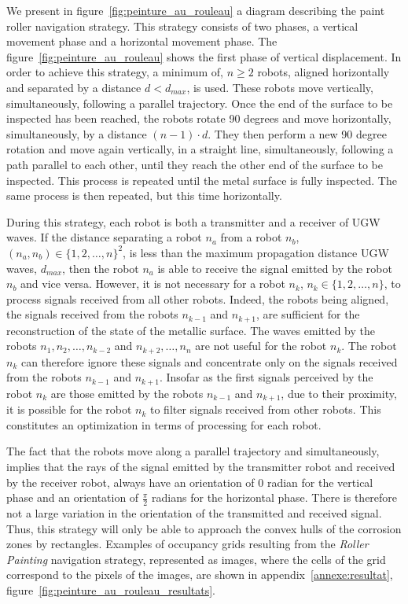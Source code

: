 \documentclass[english,RandD]{rapportPFE}  %
\begin{document}
				We present in figure~\ref{fig:peinture_au_rouleau} a diagram describing the paint roller navigation strategy.
				This strategy consists of two phases, a vertical movement phase and a horizontal movement phase.
				The figure~\ref{fig:peinture_au_rouleau} shows the first phase of vertical displacement.
				In order to achieve this strategy, a minimum of, $n \ge 2$ robots, aligned horizontally and separated by a distance $d < d_{max}$, is used.
				These robots move vertically, simultaneously, following a parallel trajectory.
				Once the end of the surface to be inspected has been reached, the robots rotate 90 degrees and move horizontally, simultaneously, by a distance $(n - 1) \cdot d$.
				They then perform a new 90 degree rotation and move again vertically, in a straight line, simultaneously, following a path parallel to each other, until they reach the other end of the surface to be inspected.
				This process is repeated until the metal surface is fully inspected.
				The same process is then repeated, but this time horizontally.

				During this strategy, each robot is both a transmitter and a receiver of UGW waves.
				If the distance separating a robot $n_a$ from a robot $n_b$, $(n_a, n_b) \in \{1, 2, \dots, n\}^2$, is less than the maximum propagation distance UGW waves, $d_{max}$, then the robot $n_a$ is able to receive the signal emitted by the robot $n_b$ and vice versa.
				However, it is not necessary for a robot $n_k$, $n_k \in \{1, 2, \dots, n\}$, to process signals received from all other robots.
				Indeed, the robots being aligned, the signals received from the robots $n_{k-1}$ and $n_{k+1}$, are sufficient for the reconstruction of the state of the metallic surface.
				The waves emitted by the robots $n_1, n_2, \dots, n_{k-2}$ and $n_{k+2}, \dots, n_n$ are not useful for the robot $n_k$.
				The robot $n_k$ can therefore ignore these signals and concentrate only on the signals received from the robots $n_{k-1}$ and $n_{k+1}$.
				Insofar as the first signals perceived by the robot $n_k$ are those emitted by the robots $n_{k-1}$ and $n_{k+1}$, due to their proximity, it is possible for the robot $n_k$ to filter signals received from other robots.
				This constitutes an optimization in terms of processing for each robot.

				The fact that the robots move along a parallel trajectory and simultaneously, implies that the rays of the signal emitted by the transmitter robot and received by the receiver robot, always have an orientation of $0$ radian for the vertical phase and an orientation of $\frac{\pi}{2}$ radians for the horizontal phase.
				There is therefore not a large variation in the orientation of the transmitted and received signal.
				Thus, this strategy will only be able to approach the convex hulls of the corrosion zones by rectangles.
				Examples of occupancy grids resulting from the \textit{Roller Painting} navigation strategy, represented as images, where the cells of the grid correspond to the pixels of the images, are shown in appendix~\ref{annexe:resultat}, figure~\ref{fig:peinture_au_rouleau_resultats}.
\end{document}
